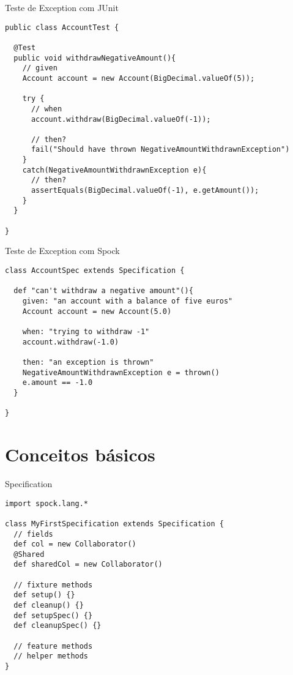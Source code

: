 \documentclass{beamer}
\begin{document}
\begin{frame}[fragile]{Teste de Exception com JUnit}
 \begin{verbatim}
public class AccountTest {

  @Test
  public void withdrawNegativeAmount(){
    // given
    Account account = new Account(BigDecimal.valueOf(5));
    
    try {
      // when
      account.withdraw(BigDecimal.valueOf(-1));
      
      // then?
      fail("Should have thrown NegativeAmountWithdrawnException")
    }
    catch(NegativeAmountWithdrawnException e){
      // then?
      assertEquals(BigDecimal.valueOf(-1), e.getAmount());
    }
  }
  
}
  \end{verbatim}
\end{frame}

\begin{frame}[fragile]{Teste de Exception com Spock}
 \begin{verbatim}
class AccountSpec extends Specification {
  
  def "can't withdraw a negative amount"(){
    given: "an account with a balance of five euros"
    Account account = new Account(5.0)
    
    when: "trying to withdraw -1"
    account.withdraw(-1.0)
    
    then: "an exception is thrown"
    NegativeAmountWithdrawnException e = thrown()
    e.amount == -1.0
  }
  
}
  \end{verbatim}
\end{frame}

\section{Conceitos básicos}

\begin{frame}[fragile]{Specification}
 \begin{verbatim}
import spock.lang.*

class MyFirstSpecification extends Specification {
  // fields
  def col = new Collaborator()
  @Shared
  def sharedCol = new Collaborator()
  
  // fixture methods
  def setup() {}
  def cleanup() {}
  def setupSpec() {}
  def cleanupSpec() {}

  // feature methods
  // helper methods
}
  \end{verbatim}
\end{frame}
\end{document}
